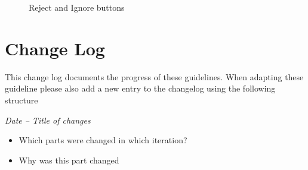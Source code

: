 \documentclass{article}
\begin{document}
\begin{figure}[h]
     \caption{Reject and Ignore buttons}
\end{figure}

\section{Change Log}
This change log documents the progress of these guidelines. When adapting these guideline please also add a new entry to the changelog using the following structure
\begin{mdframed}[frametitle={Change log}]
\emph{Date – Title of changes}
\begin{itemize}
	\item Which parts were changed in which iteration?
    \item Why was this part changed
\end{itemize}
\end{mdframed}



\end{document}
